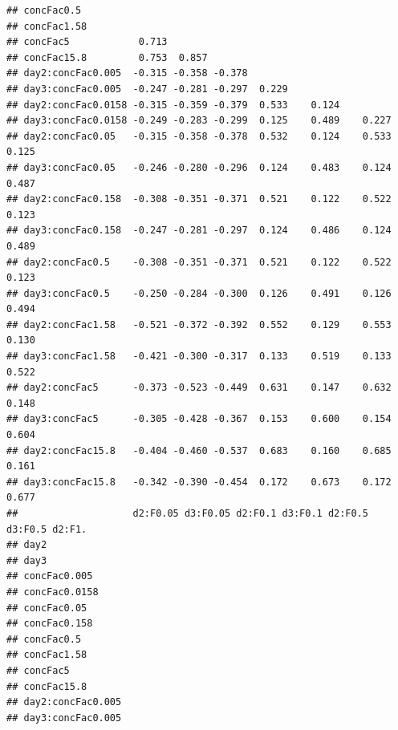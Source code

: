 \documentclass[
]{article}
\begin{document}
\begin{verbatim}
## concFac0.5                                                                 
## concFac1.58                                                                
## concFac5            0.713                                                  
## concFac15.8         0.753  0.857                                           
## day2:concFac0.005  -0.315 -0.358 -0.378                                    
## day3:concFac0.005  -0.247 -0.281 -0.297  0.229                             
## day2:concFac0.0158 -0.315 -0.359 -0.379  0.533    0.124                    
## day3:concFac0.0158 -0.249 -0.283 -0.299  0.125    0.489    0.227           
## day2:concFac0.05   -0.315 -0.358 -0.378  0.532    0.124    0.533    0.125  
## day3:concFac0.05   -0.246 -0.280 -0.296  0.124    0.483    0.124    0.487  
## day2:concFac0.158  -0.308 -0.351 -0.371  0.521    0.122    0.522    0.123  
## day3:concFac0.158  -0.247 -0.281 -0.297  0.124    0.486    0.124    0.489  
## day2:concFac0.5    -0.308 -0.351 -0.371  0.521    0.122    0.522    0.123  
## day3:concFac0.5    -0.250 -0.284 -0.300  0.126    0.491    0.126    0.494  
## day2:concFac1.58   -0.521 -0.372 -0.392  0.552    0.129    0.553    0.130  
## day3:concFac1.58   -0.421 -0.300 -0.317  0.133    0.519    0.133    0.522  
## day2:concFac5      -0.373 -0.523 -0.449  0.631    0.147    0.632    0.148  
## day3:concFac5      -0.305 -0.428 -0.367  0.153    0.600    0.154    0.604  
## day2:concFac15.8   -0.404 -0.460 -0.537  0.683    0.160    0.685    0.161  
## day3:concFac15.8   -0.342 -0.390 -0.454  0.172    0.673    0.172    0.677  
##                    d2:F0.05 d3:F0.05 d2:F0.1 d3:F0.1 d2:F0.5 d3:F0.5 d2:F1.
## day2                                                                       
## day3                                                                       
## concFac0.005                                                               
## concFac0.0158                                                              
## concFac0.05                                                                
## concFac0.158                                                               
## concFac0.5                                                                 
## concFac1.58                                                                
## concFac5                                                                   
## concFac15.8                                                                
## day2:concFac0.005                                                          
## day3:concFac0.005                                                          

\end{verbatim}
\end{document}
